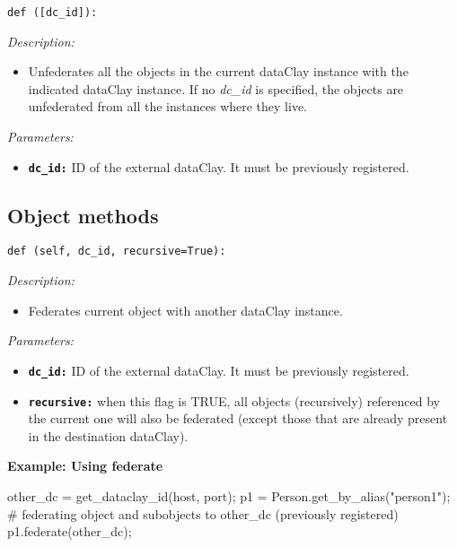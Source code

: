 \begin{dBox}

\texttt{def ([dc\_id]):}
\LINE

{\it Description:}

\begin{itemize}
  \item Unfederates all the objects in the current dataClay instance with the indicated dataClay instance. If no \textit{dc\_id} is specified, the objects are unfederated from all the instances where they live.
\end{itemize}

{\it Parameters:}

\begin{itemize}
  \item \texttt{\bfseries dc\_id:} ID of the external dataClay. It must be previously registered.
\end{itemize}

\end{dBox}

\subsection{Object methods}
\label{sec:PythonFederationObject}

\begin{dBox}
\texttt{def (self, dc\_id, recursive=True):}
\LINE

{\it Description:}

\begin{itemize}
  \item Federates current object with another dataClay instance. 
\end{itemize}

{\it Parameters:}

\begin{itemize}
  \item \texttt{\bfseries dc\_id:} ID of the external dataClay. It must be previously registered.
  \item \texttt{\bfseries recursive:} when this flag is TRUE, all objects (recursively) referenced by the current one will also be federated (except those that are already present in the destination dataClay). 
\end{itemize}
\end{dBox}


\begin{tBox}
\textcolor{basecolor} {\bf Example: Using federate}
\begin{python}
  other_dc = get_dataclay_id(host, port);
  p1 = Person.get_by_alias("person1");
  # federating object and subobjects to other_dc (previously registered)
  p1.federate(other_dc);
\end{python}
\end{tBox}

